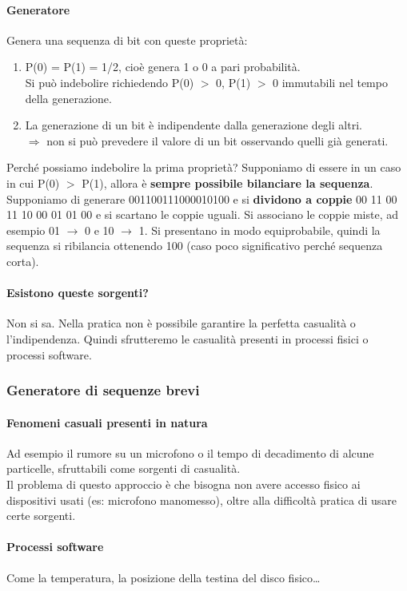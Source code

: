 \documentclass[10pt]{book}
\begin{document}
\paragraph{Generatore} Genera una sequenza di bit con queste proprietà:
\begin{enumerate}
	\item P(0) = P(1) = 1/2, cioè genera 1 o 0 a pari probabilità.\\
	Si può indebolire richiedendo P(0) $>$ 0, P(1) $>$ 0 immutabili nel tempo della generazione.
	\item La generazione di un bit è indipendente dalla generazione degli altri.\\
	$\Rightarrow$ non si può prevedere il valore di un bit osservando quelli già generati.
\end{enumerate}
Perché possiamo indebolire la prima proprietà? Supponiamo di essere in un caso in cui P(0) $>$ P(1), allora è \textbf{sempre possibile bilanciare la sequenza}.\\
Supponiamo di generare 001100111000010100 e si \textbf{dividono a coppie} 00 11 00 11 10 00 01 01 00 e si scartano le coppie uguali. Si associano le coppie miste, ad esempio 01 $\rightarrow$ 0 e 10 $\rightarrow$ 1. Si presentano in modo equiprobabile, quindi la sequenza si ribilancia ottenendo 100 (caso poco significativo perché sequenza corta).
\paragraph{Esistono queste sorgenti?} Non si sa. Nella pratica non è possibile garantire la perfetta casualità o l'indipendenza. Quindi sfrutteremo le casualità presenti in processi fisici o processi software.
\subsubsection{Generatore di sequenze brevi}
\paragraph{Fenomeni casuali presenti in natura} Ad esempio il rumore su un microfono o il tempo di decadimento di alcune particelle, sfruttabili come sorgenti di casualità.\\
Il problema di questo approccio è che bisogna non avere accesso fisico ai dispositivi usati (es: microfono manomesso), oltre alla difficoltà pratica di usare certe sorgenti.
\paragraph{Processi software} Come la temperatura, la posizione della testina del disco fisico\ldots
\end{document}
